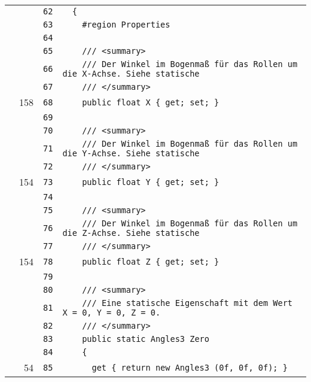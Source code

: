 \documentclass[a4paper,10pt]{article}
\begin{document}
\begin{longtable}[l]{lrrl}
\cellcolor{gray} &  & \verb~62~ & \verb~  {~\\
\cellcolor{gray} &  & \verb~63~ & \verb~    #region Properties~\\
\cellcolor{gray} &  & \verb~64~ & \verb~~\\
\cellcolor{gray} &  & \verb~65~ & \verb~    /// <summary>~\\
\cellcolor{gray} &  & \verb~66~ & \verb~    /// Der Winkel im Bogenmaß für das Rollen um die X-Achse. Siehe statische ~\\
\cellcolor{gray} &  & \verb~67~ & \verb~    /// </summary>~\\
\cellcolor{green} & 158 & \verb~68~ & \verb~    public float X { get; set; }~\\
\cellcolor{gray} &  & \verb~69~ & \verb~~\\
\cellcolor{gray} &  & \verb~70~ & \verb~    /// <summary>~\\
\cellcolor{gray} &  & \verb~71~ & \verb~    /// Der Winkel im Bogenmaß für das Rollen um die Y-Achse. Siehe statische ~\\
\cellcolor{gray} &  & \verb~72~ & \verb~    /// </summary>~\\
\cellcolor{green} & 154 & \verb~73~ & \verb~    public float Y { get; set; }~\\
\cellcolor{gray} &  & \verb~74~ & \verb~~\\
\cellcolor{gray} &  & \verb~75~ & \verb~    /// <summary>~\\
\cellcolor{gray} &  & \verb~76~ & \verb~    /// Der Winkel im Bogenmaß für das Rollen um die Z-Achse. Siehe statische ~\\
\cellcolor{gray} &  & \verb~77~ & \verb~    /// </summary>~\\
\cellcolor{green} & 154 & \verb~78~ & \verb~    public float Z { get; set; }~\\
\cellcolor{gray} &  & \verb~79~ & \verb~~\\
\cellcolor{gray} &  & \verb~80~ & \verb~    /// <summary>~\\
\cellcolor{gray} &  & \verb~81~ & \verb~    /// Eine statische Eigenschaft mit dem Wert X = 0, Y = 0, Z = 0.~\\
\cellcolor{gray} &  & \verb~82~ & \verb~    /// </summary>~\\
\cellcolor{gray} &  & \verb~83~ & \verb~    public static Angles3 Zero~\\
\cellcolor{gray} &  & \verb~84~ & \verb~    {~\\
\cellcolor{green} & 54 & \verb~85~ & \verb~      get { return new Angles3 (0f, 0f, 0f); }~\\

\end{longtable}
\end{document}
